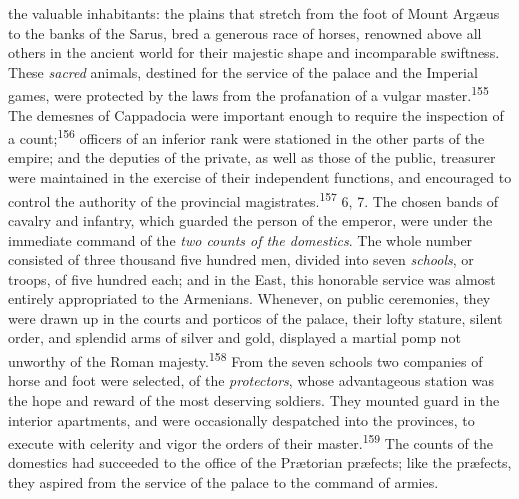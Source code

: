 the valuable inhabitants: the plains that stretch from the foot
of Mount Argæus to the banks of the Sarus, bred a generous race
of horses, renowned above all others in the ancient world for
their majestic shape and incomparable swiftness. These \textit{sacred}
animals, destined for the service of the palace and the Imperial
games, were protected by the laws from the profanation of a
vulgar master.\textsuperscript{155} The demesnes of Cappadocia were important
enough to require the inspection of a count;\textsuperscript{156} officers of an
inferior rank were stationed in the other parts of the empire;
and the deputies of the private, as well as those of the public,
treasurer were maintained in the exercise of their independent
functions, and encouraged to control the authority of the
provincial magistrates.\textsuperscript{157} 6, 7. The chosen bands of cavalry and
infantry, which guarded the person of the emperor, were under the
immediate command of the \textit{two counts of the domestics}. The whole
number consisted of three thousand five hundred men, divided into
seven \textit{schools}, or troops, of five hundred each; and in the
East, this honorable service was almost entirely appropriated to
the Armenians. Whenever, on public ceremonies, they were drawn up
in the courts and porticos of the palace, their lofty stature,
silent order, and splendid arms of silver and gold, displayed a
martial pomp not unworthy of the Roman majesty.\textsuperscript{158} From the
seven schools two companies of horse and foot were selected, of
the \textit{protectors}, whose advantageous station was the hope and
reward of the most deserving soldiers. They mounted guard in the
interior apartments, and were occasionally despatched into the
provinces, to execute with celerity and vigor the orders of their
master.\textsuperscript{159} The counts of the domestics had succeeded to the
office of the Prætorian præfects; like the præfects, they aspired
from the service of the palace to the command of armies.



